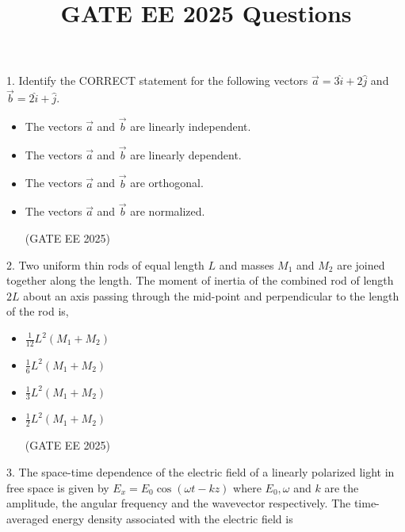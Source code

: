 \documentclass[twocolumn]{article}
\begin{document}
\title{GATE EE 2025 Questions}
\author{}
\date{}
\maketitle



1. Identify the CORRECT statement for the following vectors $\vec{a} = 3\hat{i} + 2\hat{j}$ and $\vec{b} = 2\hat{i} + \hat{j}$.


\begin{itemize}
\item[(A)] The vectors $\vec{a}$ and $\vec{b}$ are linearly independent.

\item[(B)] The vectors $\vec{a}$ and $\vec{b}$ are linearly dependent.

\item[(C)] The vectors $\vec{a}$ and $\vec{b}$ are orthogonal.

\item[(D)] The vectors $\vec{a}$ and $\vec{b}$ are normalized.

(GATE EE 2025)
  \end{itemize}




2. Two uniform thin rods of equal length $L$ and masses $M_1$ and $M_2$ are joined together along the length. The moment of inertia of the combined rod of length $2L$ about an axis passing through the mid-point and perpendicular to the length of the rod is,

\begin{itemize}
\item[(A)] $\frac{1}{12} L^2 (M_1 + M_2)$

\item[(B)] $\frac{1}{6} L^2 (M_1 + M_2)$

\item[(C)] $\frac{1}{3} L^2 (M_1 + M_2)$

\item[(D)] $\frac{1}{2} L^2 (M_1 + M_2)$

(GATE EE 2025)
  \end{itemize}




3. The space-time dependence of the electric field of a linearly polarized light in free space is given by $E_x = E_0 \cos(\omega t - kz)$ where $E_0, \omega$ and $k$ are the amplitude, the angular frequency and the wavevector respectively. The time-averaged energy density associated with the electric field is
\end{document}
